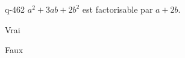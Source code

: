 \begin{truefalse}{q-462}
$a^2+3ab+2b^2$ est factorisable par $a+2b$.
\item* Vrai
\item Faux
\end{truefalse}

